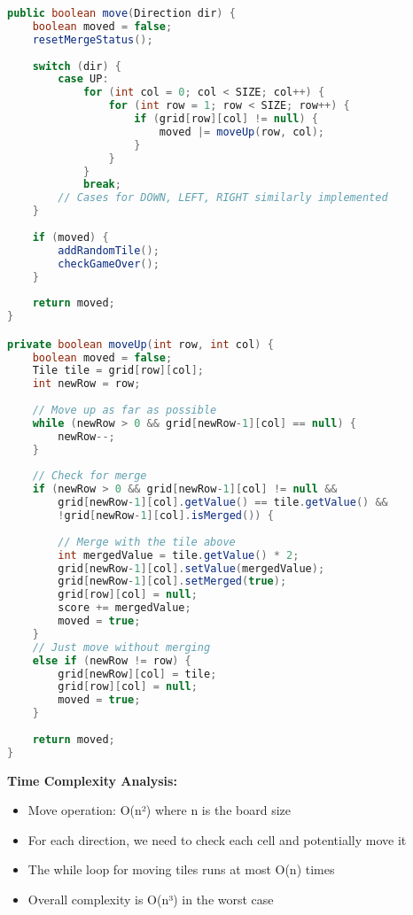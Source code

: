 \documentclass[12pt, a4paper]{article}
\begin{document}
\begin{lstlisting}[language=Java, caption=Move and Merge Algorithm]
public boolean move(Direction dir) {
    boolean moved = false;
    resetMergeStatus();
    
    switch (dir) {
        case UP:
            for (int col = 0; col < SIZE; col++) {
                for (int row = 1; row < SIZE; row++) {
                    if (grid[row][col] != null) {
                        moved |= moveUp(row, col);
                    }
                }
            }
            break;
        // Cases for DOWN, LEFT, RIGHT similarly implemented
    }
    
    if (moved) {
        addRandomTile();
        checkGameOver();
    }
    
    return moved;
}

private boolean moveUp(int row, int col) {
    boolean moved = false;
    Tile tile = grid[row][col];
    int newRow = row;
    
    // Move up as far as possible
    while (newRow > 0 && grid[newRow-1][col] == null) {
        newRow--;
    }
    
    // Check for merge
    if (newRow > 0 && grid[newRow-1][col] != null && 
        grid[newRow-1][col].getValue() == tile.getValue() && 
        !grid[newRow-1][col].isMerged()) {
        
        // Merge with the tile above
        int mergedValue = tile.getValue() * 2;
        grid[newRow-1][col].setValue(mergedValue);
        grid[newRow-1][col].setMerged(true);
        grid[row][col] = null;
        score += mergedValue;
        moved = true;
    } 
    // Just move without merging
    else if (newRow != row) {
        grid[newRow][col] = tile;
        grid[row][col] = null;
        moved = true;
    }
    
    return moved;
}
\end{lstlisting}

\textbf{Time Complexity Analysis:}
\begin{itemize}
    \item Move operation: O(n²) where n is the board size
    \item For each direction, we need to check each cell and potentially move it
    \item The while loop for moving tiles runs at most O(n) times
    \item Overall complexity is O(n³) in the worst case
\end{itemize}
\end{document}
